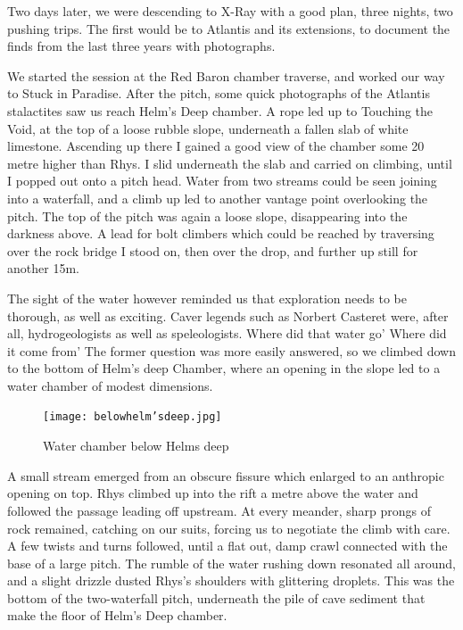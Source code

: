 \documentclass[onecolumn]{book}
\begin{document}
Two days later, we were descending to X-Ray with a good plan, three nights, two pushing trips. The first would be to Atlantis and its extensions, to document the finds from the last three years with photographs. 

We started the session at the Red Baron chamber traverse, and worked our way to Stuck in Paradise. After the pitch, some quick photographs of the Atlantis stalactites saw us reach Helm's Deep chamber. A rope led up to Touching the Void, at the top of a loose rubble slope, underneath a fallen slab of white limestone. Ascending up there I gained a good view of the chamber some 20 metre higher than Rhys. I slid underneath the slab and carried on climbing, until I popped out onto a pitch head. Water from two streams could be seen joining into a waterfall, and a climb up led to another vantage point overlooking the pitch. The top of the pitch was again a loose slope, disappearing into the darkness above. A lead for bolt climbers which could be reached by traversing over the rock bridge I stood on, then over the drop, and further up still for another 15m. 

The sight of the water however reminded us that exploration needs to be thorough, as well as exciting. Caver legends such as Norbert Casteret were, after all, hydrogeologists as well as speleologists. Where did that water go' Where did it come from' The former question was more easily answered, so we climbed down to the bottom of Helm's deep Chamber, where an opening in the slope led to a water chamber of modest dimensions.

\begin{figure}[h]
\centering
\texttt{[image: belowhelm'sdeep.jpg]}
\caption{Water chamber below Helms deep}
\label{water chamber below helm's deep}
\end{figure}

A small stream emerged from an obscure fissure which enlarged to an anthropic opening on top. Rhys climbed up into the rift a metre above the water and followed the passage leading off upstream. At every meander, sharp prongs of rock remained, catching on our suits, forcing us to negotiate the climb with care. A few twists and turns followed, until a flat out, damp crawl connected with the base of a large pitch. The rumble of the water rushing down resonated all around, and a slight drizzle dusted Rhys's shoulders with glittering droplets. This was the bottom of the two-waterfall pitch, underneath the pile of  cave sediment that make the floor of Helm's Deep chamber. 
\end{document}
